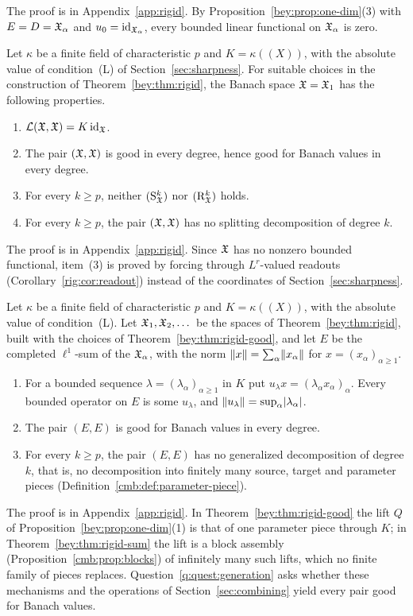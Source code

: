 The proof is in Appendix~\ref{app:rigid}. By Proposition~\ref{bey:prop:one-dim}(3) with $E=D=\mathfrak X_\alpha$ and
$u_0=\mathrm{id}_{\mathfrak X_\alpha}$, every bounded linear functional on $\mathfrak X_\alpha$ is zero.

\begin{theorem}\label{bey:thm:rigid-good}
Let $\kappa$ be a finite field of characteristic $p$ and $K=\kappa((X))$, with the absolute value of condition~(L) of
Section~\ref{sec:sharpness}. For suitable choices in the construction of Theorem~\ref{bey:thm:rigid}, the Banach space
$\mathfrak X=\mathfrak X_1$ has the following properties.
\begin{enumerate}
\item $\mathcal L(\mathfrak X,\mathfrak X)=K\,\mathrm{id}_{\mathfrak X}$.
\item The pair $(\mathfrak X,\mathfrak X)$ is good in every degree, hence good for Banach values in every degree.
\item For every $k\ge p$, neither $(\mathrm S^k_{\mathfrak X})$ nor $(\mathrm R^k_{\mathfrak X})$ holds.
\item For every $k\ge p$, the pair $(\mathfrak X,\mathfrak X)$ has no splitting decomposition of degree $k$.
\end{enumerate}
\end{theorem}

The proof is in Appendix~\ref{app:rigid}. Since $\mathfrak X$ has no nonzero bounded functional, item~(3) is proved by
forcing through $L^r$-valued readouts (Corollary~\ref{rig:cor:readout}) instead of the coordinates of
Section~\ref{sec:sharpness}.

\begin{theorem}\label{bey:thm:rigid-sum}
Let $\kappa$ be a finite field of characteristic $p$ and $K=\kappa((X))$, with the absolute value of condition~(L).
Let $\mathfrak X_1,\mathfrak X_2,\dots$ be the spaces of Theorem~\ref{bey:thm:rigid}, built with the choices of
Theorem~\ref{bey:thm:rigid-good}, and let $E$ be the completed $\ell^1$-sum of the $\mathfrak X_\alpha$, with the norm
$\lVert x\rVert=\sum_\alpha\lVert x_\alpha\rVert$ for $x=(x_\alpha)_{\alpha\ge1}$.
\begin{enumerate}
\item For a bounded sequence $\lambda=(\lambda_\alpha)_{\alpha\ge1}$ in $K$ put $u_\lambda x=(\lambda_\alpha x_\alpha)_\alpha$.
Every bounded operator on $E$ is some $u_\lambda$, and $\lVert u_\lambda\rVert=\sup_\alpha\lvert \lambda_\alpha\rvert$.
\item The pair $(E,E)$ is good for Banach values in every degree.
\item For every $k\ge p$, the pair $(E,E)$ has no generalized decomposition of degree $k$, that is, no decomposition
into finitely many source, target and parameter pieces (Definition~\ref{cmb:def:parameter-piece}).
\end{enumerate}
\end{theorem}

The proof is in Appendix~\ref{app:rigid}. In Theorem~\ref{bey:thm:rigid-good} the lift $Q$ of
Proposition~\ref{bey:prop:one-dim}(1) is that of one parameter piece through $K$; in Theorem~\ref{bey:thm:rigid-sum}
the lift is a block assembly (Proposition~\ref{cmb:prop:blocks}) of infinitely many such lifts, which no finite family
of pieces replaces. Question~\ref{q:quest:generation} asks whether these mechanisms and the operations of
Section~\ref{sec:combining} yield every pair good for Banach values.
